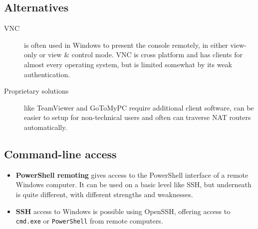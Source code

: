 \documentclass{pgnotes}
\begin{document}
\subsection{Alternatives}\label{alternatives}

\begin{description}
\item[VNC]
is often used in Windows to present the console remotely, in either
view-only or view \& control mode. VNC is cross platform and has clients
for almost every operating system, but is limited somewhat by its weak
authentication.
\item[Proprietary solutions]
like TeamViewer and GoToMyPC require additional client software, can be
easier to setup for non-technical users and often can traverse NAT
routers automatically.
\end{description}

\subsection{Command-line access}\label{command-line-access}

\begin{itemize}
\item
  \textbf{PowerShell remoting} gives access to the PowerShell interface
  of a remote Windows computer. It can be used on a basic level like
  SSH, but underneath is quite different, with different strengths and
  weaknesses.
\item
  \textbf{SSH} access to Windows is possible using OpenSSH, offering
  access to \texttt{cmd.exe} or \texttt{PowerShell} from remote
  computers.
\end{itemize}




\end{document}

